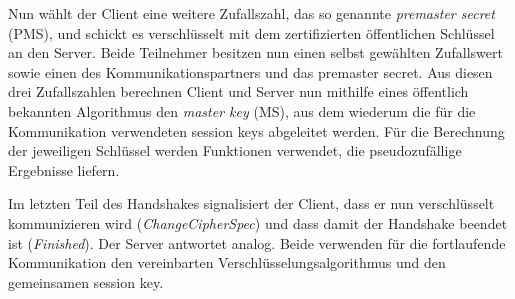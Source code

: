 Nun wählt der Client eine weitere Zufallszahl, das so genannte
\emph{premaster secret} (PMS)\indexTLSPreMasterSecret, und schickt es
verschlüsselt mit dem zertifizierten öffentlichen Schlüssel an den
Server. Beide Teilnehmer besitzen nun einen selbst gewählten Zufallswert
sowie einen des Kommunikationspartners und das premaster secret. Aus
diesen drei Zufallszahlen berechnen Client und Server nun mithilfe eines
öffentlich bekannten Algorithmus den \emph{master key}
(MS)\indexTLSMasterKey, aus dem wiederum die für die Kommunikation
verwendeten session keys abgeleitet werden.  Für die Berechnung der
jeweiligen Schlüssel werden Funktionen verwendet, die pseudozufällige
Ergebnisse liefern.

Im letzten Teil des Handshakes signalisiert der Client, dass er nun
verschlüsselt kommunizieren wird (\emph{ChangeCipherSpec}) und dass
damit der Handshake beendet ist (\emph{Finished}). Der Server antwortet
analog. Beide verwenden für die fortlaufende Kommunikation den
vereinbarten Verschlüsselungsalgorithmus und den gemeinsamen session
key.
